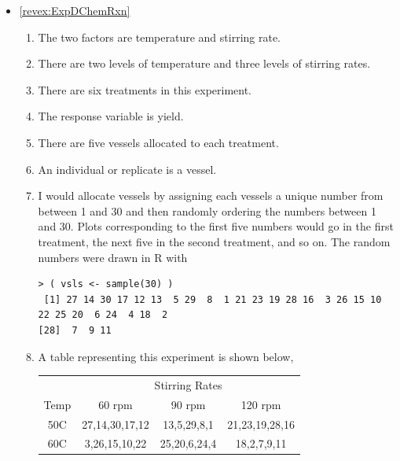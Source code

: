 \documentclass[10pt,openany]{book}\usepackage[]{graphicx}\usepackage[]{color}
\makeatletter
\newenvironment{kframe}{%
 \def\at@end@of@kframe{}%
 \ifinner\ifhmode%
  \def\at@end@of@kframe{\end{minipage}}%
  \begin{minipage}{\columnwidth}%
 \fi\fi%
 \def\FrameCommand##1{\hskip\@totalleftmargin \hskip-\fboxsep
 \colorbox{shadecolor}{##1}\hskip-\fboxsep
     \hskip-\linewidth \hskip-\@totalleftmargin \hskip\columnwidth}%
 \MakeFramed {\advance\hsize-\width
   \@totalleftmargin\z@ \linewidth\hsize
   \@setminipage}}%
 {\par\unskip\endMakeFramed%
 \at@end@of@kframe}
\newenvironment{knitrout}{}{} %
\makeatother
\begin{document}
\begin{itemize}
  \item \hypertarget{ans:ExpDChemRxn}{\ref{revex:ExpDChemRxn}}
    \begin{enumerate}
      \item The two factors are temperature and stirring rate.
      \item There are two levels of temperature and three levels of stirring rates.
      \item There are six treatments in this experiment.
      \item The response variable is yield.
      \item There are five vessels allocated to each treatment.
      \item An individual or replicate is a vessel.
      \item I would allocate vessels by assigning each vessels a unique number from between 1 and 30 and then randomly ordering the numbers between 1 and 30.  Plots corresponding to the first five numbers would go in the first treatment, the next five in the second treatment, and so on.  The random numbers were drawn in R with
\begin{knitrout}
\color{fgcolor}\begin{kframe}
\begin{verbatim}
> ( vsls <- sample(30) )
 [1] 27 14 30 17 12 13  5 29  8  1 21 23 19 28 16  3 26 15 10 22 25 20  6 24  4 18  2
[28]  7  9 11
\end{verbatim}
\end{kframe}
\end{knitrout}
      \item A table representing this experiment is shown below,

\begin{tabular}{cc|c|c}
 & \multicolumn{3}{c}{Stirring Rates} \\
\cline{2-4}
Temp & 60 rpm & 90 rpm & 120 rpm  \\
\cline{2-4}
\multicolumn{1}{c|}{50C} & 27,14,30,17,12 & 13,5,29,8,1 & \multicolumn{1}{c|}{21,23,19,28,16} \\
\hline
\multicolumn{1}{c|}{60C} & 3,26,15,10,22 & 25,20,6,24,4 & \multicolumn{1}{c|}{18,2,7,9,11} \\
\cline{2-4}
\end{tabular}
    \end{enumerate}


\end{itemize}
\end{document}
